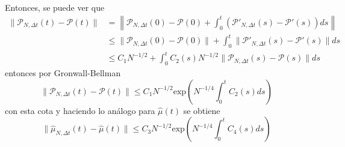 Entonces, se puede ver que
\[
\begin{aligned}
    \| \mathcal{P}_{N, \Delta t}(t) - \mathcal{P}(t) \| &= \left \| \mathcal{P}_{N, \Delta t}(0) - \mathcal{P}(0) + \int_0^t (\mathcal{P}'_{N, \Delta t}(s) - \mathcal{P}'(s))ds \right \| \\
    &\leq \| \mathcal{P}_{N, \Delta t}(0) - \mathcal{P}(0) \| + \int_0^t \| \mathcal{P}'_{N, \Delta t}(s) - \mathcal{P}'(s) \| ds \\
    &\leq C_1 N^{-1/2} + \int_0^t C_2(s) N^{-1/2} \|  \mathcal{P}_{N, \Delta t}(s) - \mathcal{P}(s) \| ds
\end{aligned}
\]
entonces por Gronwall-Bellman
\[
    \| \mathcal{P}_{N, \Delta t}(t) - \mathcal{P}(t) \| \leq C_1 N^{-1/2} \text{exp} \left ( N^{-1/4} \int_0^t C_2 (s) ds \right )
\]
con esta cota y haciendo lo análogo para $\hat{\mu}(t)$ se obtiene
\[
    \| \hat{\mu}_{N, \Delta t}(t) - \hat{\mu}(t) \| \leq C_3 N^{-1/2} \text{exp} \left ( N^{-1/4} \int_0^t C_4 (s) ds \right )
\]